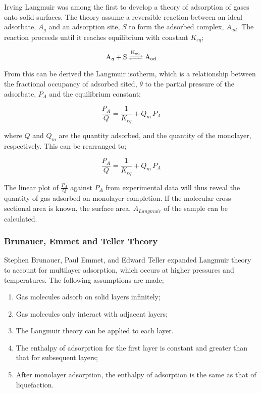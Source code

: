 Irving Langmuir was among the first to develop a theory of adsorption of gases onto solid surfaces. The theory assume a reversible reaction between an ideal adsorbate, $A_g$ and an adsorption site, $S$ to form the adsorbed complex, $A_{ad}$. The reaction proceeds until it reaches equilibrium with constant $K_{eq}$;

\begin{equation}
    \ce{A_g + S <=>[K_{eq}] A_{ad}}
\end{equation}

From this can be derived the Langmuir isotherm, which is a relationship between the fractional occupancy of adsorbed sited, $\theta$ to the partial pressure of the adsorbate, $P_A$ and the equilibrium constant; 

\begin{equation}
    \frac{P_A}{Q} = \frac{1}{K_{eq}} + Q_m \, P_A
\end{equation}

where $Q$ and $Q_m$ are the quantity adsorbed, and the quantity of the monolayer, respectively.\citep{Langmuir1916constitution, Langmuir1918adsorption} This can be rearranged to;

\begin{equation}
    \frac{P_A}{Q} = \frac{1}{K_{eq}} + Q_m \, P_A
\end{equation}

The linear plot of $\frac{P_A}{Q}$ against $P_A $ from experimental data will thus reveal the quantity of gas adsorbed on monolayer completion. If the molecular cross-sectional area is known, the surface area, $A_{Langmuir}$ of the sample can be calculated.

\subsubsection{Brunauer, Emmet and Teller Theory}

Stephen Brunauer, Paul Emmet, and Edward Teller expanded Langmuir theory to account for multilayer adsorption, which occurs at higher pressures and temperatures. The following assumptions are made;

	\begin{enumerate}
		\item Gas molecules adsorb on solid layers infinitely;
		\item Gas molecules only interact with adjacent layers;
		\item The Langmuir theory can be applied to each layer.
		\item The enthalpy of adsorprtion for the first layer is constant and greater than that for subsequent layers;
		\item After monolayer adsorption, the enthalpy of adsorption is the same as that of liquefaction.
	\end{enumerate}

